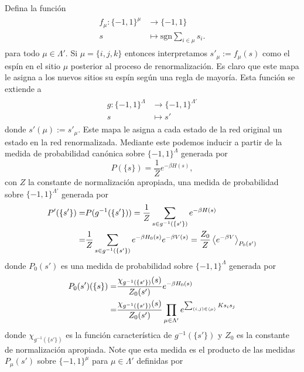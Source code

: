 \documentclass{article}
\begin{document}
\begin{enumerate}
Defina la función 
\begin{align}
\begin{split}
f_\mu:\{-1,1\}^\mu&\rightarrow\{-1,1\}\\
s&\mapsto \text{sgn}\sum_{i\in\mu}s_i.
\end{split}
\end{align}
para todo $\mu\in\Lambda'$. Si $\mu=\{i,j,k\}$ entonces interpretamos $s'_\mu:=f_\mu(s)$ como el espín en el sitio $\mu$ posterior al proceso de renormalización. Es claro que este mapa le asigna a los nuevos sitios su espín según una regla de mayoría. Esta función se extiende a
\begin{align}
\begin{split}
g:\{-1,1\}^\Lambda&\rightarrow\{-1,1\}^{\Lambda'}\\
s&\mapsto s'
\end{split}
\end{align}
donde $s'(\mu):=s'_\mu$. Este mapa le asigna a cada estado de la red original un estado en la red renormalizada. Mediante este podemos inducir a partir de la medida de probabilidad canónica sobre $\{-1,1\}^\Lambda$ generada por
\begin{equation}
P(\{s\})=\frac{1}{Z}e^{-\beta H(s)},
\end{equation}
con $Z$ la constante de normalización apropiada, una medida de probabilidad sobre $\{-1,1\}^{\Lambda'}$ generada por
\begin{align}
\begin{split}
P'(\{s'\})=&P(g^{-1}(\{s'\}))=\frac{1}{Z}\sum_{s\in g^{-1}(\{s'\})}e^{-\beta H(s)}\\
=&\frac{1}{Z}\sum_{s\in g^{-1}(\{s'\})}e^{-\beta H_0(s)}e^{-\beta V(s)}=\frac{Z_0}{Z}\ev{e^{-\beta V}}_{P_0(s')}
\end{split}
\end{align}
donde $P_0(s')$ es una medida de probabilidad sobre $\{-1,1\}^\Lambda$ generada por
\begin{align}
\begin{split}
P_0(s')(\{s\})=&\frac{\chi_{g^{-1}(\{s'\})}(s)}{Z_0(s')}e^{-\beta H_0(s)}\\
=&\frac{\chi_{g^{-1}(\{s'\})}(s)}{Z_0(s')}\prod_{\mu\in\Lambda'}e^{\sum_{(i,j)\in\ev{\mu}}Ks_is_j}
\end{split}
\end{align}
donde $\chi_{g^{-1}(\{s'\})}$ es la función característica de $g^{-1}(\{s'\})$ y $Z_0$ es la constante de normalización apropiada. Note que esta medida es el producto de las medidas $P_\mu(s')$ sobre $\{-1,1\}^\mu$ para $\mu\in\Lambda'$ definidas por

\end{enumerate}
\end{document}
